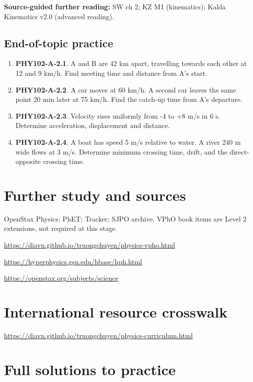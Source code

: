 \documentclass[11pt,a4paper,openany]{book}
\begin{document}
\textbf{Source-guided further reading:} SW ch 2; KZ M1 (kinematics); Kalda Kinematics v2.0 (advanced reading).

\section{End-of-topic practice}
\begin{enumerate}
\item \textbf{PHY102-A-2.1}. A and B are 42 km apart, travelling towards each other at 12 and 9 km/h. Find meeting time and distance from A's start.
\item \textbf{PHY102-A-2.2}. A car moves at 60 km/h. A second car leaves the same point 20 min later at 75 km/h. Find the catch-up time from A's departure.
\item \textbf{PHY102-A-2.3}. Velocity rises uniformly from -4 to +8 m/s in 6 s. Determine acceleration, displacement and distance.
\item \textbf{PHY102-A-2.4}. A boat has speed 5 m/s relative to water. A river 240 m wide flows at 3 m/s. Determine minimum crossing time, drift, and the direct-opposite crossing time.
\end{enumerate}
\chapter*{Further study and sources}
OpenStax Physics; PhET; Tracker; SJPO archive. VPhO book items are Level 2 extensions, not required at this stage.

\url{https://diavn.github.io/truongchuyen/physics-vpho.html}

\url{https://hyperphysics.gsu.edu/hbase/hph.html}

\url{https://openstax.org/subjects/science}
\chapter*{International resource crosswalk}
\url{https://diavn.github.io/truongchuyen/physics-curriculum.html}
\appendix
\chapter{Full solutions to practice}
\end{document}
